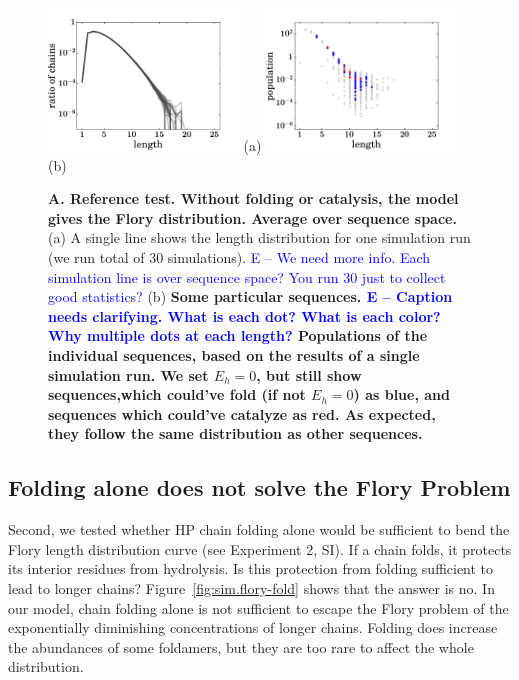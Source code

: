 \documentclass[journal=jacsat,manuscript=article,layout=twocolumn]{achemso}
\newcommand*{\blue}[1]{\textcolor{blue}{#1}}
\begin{document}
\begin{figure}[hbt!]
  \centering
  \includegraphics[width=0.45\textwidth]{pictures/distrPlain-many.pdf} (a)
  \includegraphics[width=0.45\textwidth]{pictures/scatter01918.png} (b)
  \caption{\footnotesize{\textbf{A.  Reference test.  Without folding or catalysis, the model gives 
the Flory distribution.  Average over sequence space.}  (a) A single line shows the length 
distribution 
for one simulation run (we run total of 30 simulations). \blue{E -- We need more info.  Each 
simulation line is over sequence space?  You run 30 just to collect good statistics?}  (b) \bf{Some 
particular sequences.} \blue{E -- Caption needs clarifying.  What is each dot?  What is each 
color?  Why multiple dots at each length?}
Populations of the individual sequences, based 
on the results of a single simulation run. 
We set $E_h=0$, but still show sequences,which could've fold (if not $E_h=0$) as 
blue, and sequences which could've catalyze as red. As expected, they follow the same distribution 
as other sequences.}}
  \label{fig:sim_pure_flory}
\end{figure}

\subsection{Folding alone does not solve the Flory Problem}
 Second, we tested whether HP chain folding alone would be sufficient to bend the Flory length 
distribution curve (see Experiment 2, SI).  If a chain folds, it protects its interior residues from 
hydrolysis.  Is this protection from folding sufficient to lead to longer chains?  
Figure~\ref{fig:sim.flory-fold} shows that the answer is no.  In our model, chain folding alone is 
not sufficient to escape the Flory problem of the exponentially diminishing concentrations of longer 
chains.  Folding does increase the abundances of some foldamers, but they are too rare to affect the 
whole distribution.
 
\end{document}
